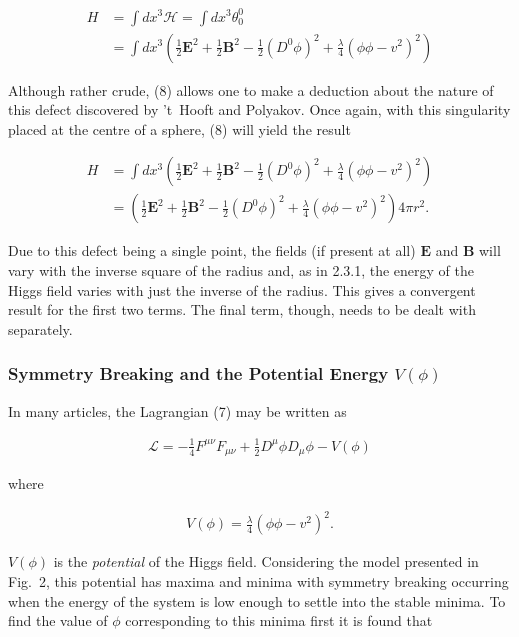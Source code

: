 \documentclass[fleqn, twocolumn, 10pt]{article}
\begin{document}
\begin{ceqn} 
\begin{align*}\tag{8}
H &= \int dx^3 \mathcal{H} = \int dx^3 \theta^0_0\\ 
&= \int dx^3 \left(\frac{1}{2}\bm{E}^2 + \frac{1}{2}\bm{B}^2 - \frac{1}{2} (D^0 \phi)^2 + \frac{\lambda}{4}(\phi \phi - v^2)^2\right)
\end{align*}
\end{ceqn}

Although rather crude, (8) allows one to make a deduction about the nature of this defect discovered by 't~Hooft and Polyakov. Once again, with this singularity placed at the centre of a sphere, (8) will yield the result 

\begin{ceqn} 
\begin{align*}
H &= \int dx^3 \left(\frac{1}{2}\bm{E}^2 + \frac{1}{2}\bm{B}^2 - \frac{1}{2} (D^0 \phi)^2 + \frac{\lambda}{4}(\phi \phi - v^2)^2\right)\\
&= \left(\frac{1}{2}\bm{E}^2 + \frac{1}{2}\bm{B}^2 - \frac{1}{2} (D^0 \phi)^2 + \frac{\lambda}{4}(\phi \phi - v^2)^2\right)4\pi r^2.
\end{align*}
\end{ceqn}
Due to this defect being a single point, the fields (if present at all) $\bm{E}$ and $\bm{B}$ will vary with the inverse square of the radius and, as in 2.3.1, the energy of the Higgs field varies with just the inverse of the radius. This gives a convergent result for the first two terms. The final term, though, needs to be dealt with separately.


\subsubsection{Symmetry Breaking and the Potential Energy $V(\phi)$}

In many articles, the Lagrangian (7) may be written as 

\begin{ceqn}
\begin{align*}
\mathcal{L} = -\frac{1}{4}F^{\mu\nu}F_{\mu\nu} + \frac{1}{2} D^\mu \phi D_\mu \phi - V(\phi)
\end{align*}
\end{ceqn}
where

\begin{ceqn}
\begin{align*}
V(\phi) = \frac{\lambda}{4}(\phi \phi - v^2)^2.
\end{align*}
\end{ceqn}
$V(\phi)$ is the \textit{potential} of the Higgs field. Considering the model presented in Fig.~2, this potential has maxima and minima with symmetry breaking occurring when the energy of the system is low enough to settle into the stable minima. To find the value of $\phi$ corresponding to this minima first it is found that \cite{purdy2017particle}
\end{document}
